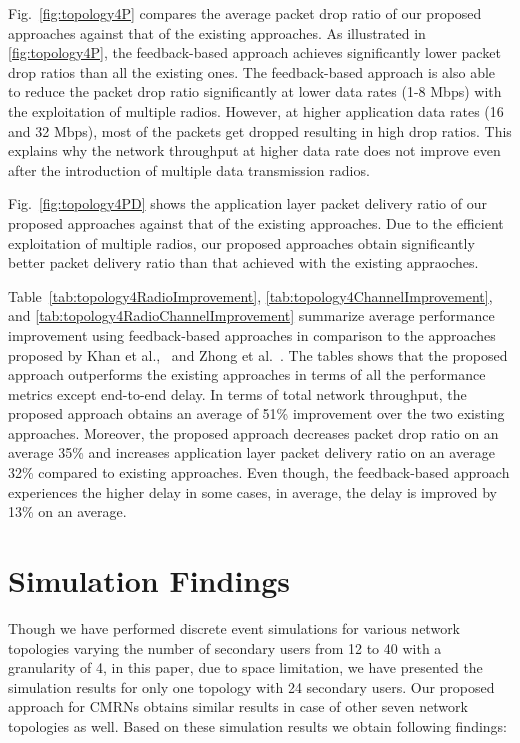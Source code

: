 Fig.~\ref{fig:topology4P} compares the average packet drop ratio of our proposed approaches against that of the existing approaches.  As illustrated in \cref{fig:topology4P}, the feedback-based approach achieves significantly lower packet drop ratios than all the existing ones. The feedback-based approach is also able to reduce the packet drop ratio significantly at lower data rates (1-8 Mbps) with the exploitation of multiple radios. However, at higher application data rates (16 and 32 Mbps), most of the packets get dropped resulting in high drop ratios. This explains why the network throughput at higher data rate does not improve even after the introduction of multiple data transmission radios.

Fig.~\ref{fig:topology4PD} shows the application layer packet delivery ratio of our proposed approaches against that of the existing approaches. Due to the efficient exploitation of multiple radios, our proposed approaches obtain significantly better packet delivery ratio than that achieved with the existing appraoches.

Table~\ref{tab:topology4RadioImprovement}, \ref{tab:topology4ChannelImprovement}, and \ref{tab:topology4RadioChannelImprovement} summarize average performance improvement using feedback-based approaches in comparison to the approaches proposed by Khan et al.,~\cite{khan2015towards} and Zhong et al.~\cite{zhong2014capacity}. The tables shows that the proposed approach outperforms the existing approaches in terms of all the performance metrics except end-to-end delay. In terms of total network throughput, the proposed approach obtains an average of 51\% improvement over the two existing approaches. Moreover, the proposed approach decreases packet drop ratio on an average 35\% and increases application layer packet delivery ratio on an average 32\% compared to existing approaches. Even though, the feedback-based approach experiences the higher delay in some cases, in average, the delay is improved by 13\% on an average.
%



\section{Simulation Findings}

Though we have performed discrete event simulations for various network topologies varying the number of secondary users from 12 to 40 with a granularity of 4, in this paper, due to space limitation, we have presented the simulation results for only one topology with 24 secondary users. Our proposed approach for CMRNs obtains similar results in case of other seven network topologies as well. Based on these simulation results we obtain following findings:

